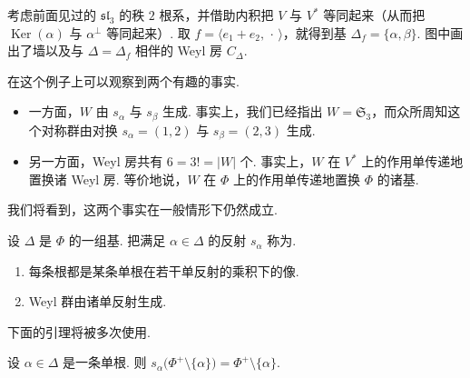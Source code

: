 \begin{example*}
考虑前面见过的 $\mathfrak{sl}_3$ 的秩 $2$ 根系，并借助内积把 $V$ 与 $V^{*}$ 等同起来（从而把 $\operatorname{Ker}(\alpha)$ 与 $\alpha^{\perp}$ 等同起来）. 取 $f=\langle e_1+e_2,\,\cdot\,\rangle$，就得到基 $\Delta_f=\{\alpha,\beta\}$. 图中画出了墙以及与 $\Delta=\Delta_f$ 相伴的 Weyl 房 $C_{\Delta}$.
\begin{center}
\end{center}
\end{example*}
在这个例子上可以观察到两个有趣的事实.
\begin{itemize}
\item 一方面，$W$ 由 $s_{\alpha}$ 与 $s_{\beta}$ 生成. 事实上，我们已经指出 $W=\mathfrak{S}_3$，而众所周知这个对称群由对换 $s_{\alpha}=(1,2)$ 与 $s_{\beta}=(2,3)$ 生成.
\item 另一方面，Weyl 房共有 $6=3!=|W|$ 个. 事实上，$W$ 在 $V^{*}$ 上的作用单传递地置换诸 Weyl 房. 等价地说，$W$ 在 $\Phi$ 上的作用单传递地置换 $\Phi$ 的诸基.
\end{itemize}
我们将看到，这两个事实在一般情形下仍然成立.
\begin{proposition}\label{prop:ssl-3-2-7}
设 $\Delta$ 是 $\Phi$ 的一组基. 把满足 $\alpha\in\Delta$ 的反射 $s_{\alpha}$ 称为.
\begin{enumerate}[label=\roman*)]
\item 每条根都是某条单根在若干单反射的乘积下的像.
\item Weyl 群由诸单反射生成.
\end{enumerate}
\end{proposition}
下面的引理将被多次使用.
\begin{lemma*}
设 $\alpha\in\Delta$ 是一条单根. 则 $s_{\alpha}\bigl(\Phi^{+}\setminus\{\alpha\}\bigr)=\Phi^{+}\setminus\{\alpha\}$.
\end{lemma*}
